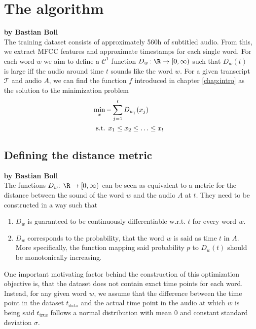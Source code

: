 \chapter{The algorithm}
\label{chap:algorithm}

\textbf{by Bastian Boll} \\

The training dataset consists of approximately 560h of subtitled audio. From this, we extract MFCC features and approximate timestamps for each single word. For each word $w$ we aim to define a $\mathcal{C}^1$ function \(D_w\colon \R \to \lbrack 0, \infty)\) such that $D_w(t)$ is large iff the audio around time $t$ sounds like the word $w$. For a given transcript $\mathcal{T}$ and audio $A$, we can find the function $f$ introduced in chapter \ref{chap:intro} as the solution to the minimization problem
\begin{align*}
	&\min_x -\sum_{j=1}^l D_{w_j}(x_j)\\
	&\hspace{0.5em}\text{s.t. }x_1\leq x_2\leq \dotsc\leq x_l
\end{align*}

\section{Defining the distance metric}

\textbf{by Bastian Boll} \\

The functions \(D_w\colon \R \to \lbrack 0, \infty)\) can be seen as equivalent to a metric for the distance between the sound of the word $w$ and the audio $A$ at $t$. They need to be constructed in a way such that
\begin{enumerate}
	\item $D_w$ is guaranteed to be continuously differentiable w.r.t. $t$ for every word $w$.
	\item $D_w$ corresponds to the probability, that the word $w$ is said as time $t$ in $A$. More specifically, the function mapping said probability $p$ to $D_w(t)$ should be monotonically increasing.
\end{enumerate}

One important motivating factor behind the construction of this optimization objective is, that the dataset does not contain exact time points for each word. Instead, for any given word $w$, we assume that the difference between the time point in the dataset $t_\text{data}$ and the actual time point in the audio at which $w$ is being said $t_\text{true}$ follows a normal distribution with mean $0$ and constant standard deviation $\sigma$.

